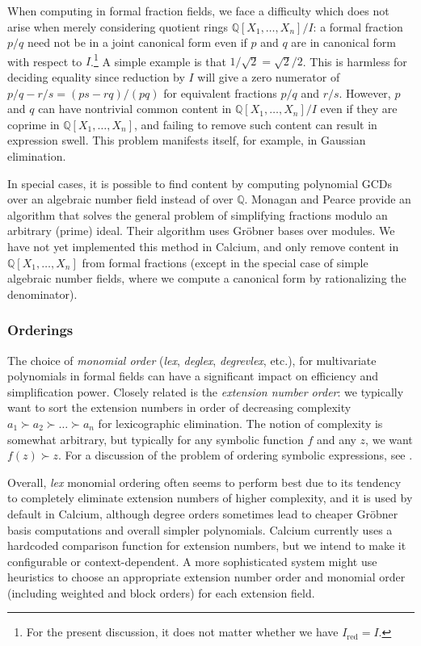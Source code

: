 \documentclass[11pt,a4paper]{article}
\begin{document}
When computing in formal fraction fields,
we face a difficulty
which does not arise when merely considering
quotient rings
$\mathbb{Q}[X_1,\ldots,X_n] / I$:
a formal fraction $p / q$ need not be
in a joint canonical form even if $p$ and $q$ are in canonical
form with respect to $I$.\footnote{For the present discussion, it does
not matter whether we have $I_{\text{red}} = I$.}
A simple example is that $1/\sqrt{2} = \sqrt{2}/2$.
This is harmless for deciding equality since
reduction by $I$ will give a zero numerator of
$p / q - r / s = (ps - rq)/(pq)$ for equivalent fractions $p/q$ and $r/s$.
However, $p$ and $q$ can have nontrivial
common content in $\mathbb{Q}[X_1,\ldots,X_n] / I$
even if they are coprime in $\mathbb{Q}[X_1,\ldots,X_n]$,
and failing to remove such content can result in expression swell.
This problem manifests itself, for example, in Gaussian elimination.

In special cases, it is possible to find
content by computing polynomial GCDs over an algebraic number field
instead of over $\mathbb{Q}$.
Monagan and Pearce \cite{Mon2006} provide
an algorithm that solves the general problem of simplifying
fractions modulo an arbitrary (prime) ideal.
Their algorithm uses Gr\"{o}bner bases over modules.
We have not yet implemented this method in Calcium,
and only remove content in $\mathbb{Q}[X_1,\ldots,X_n]$
from formal fractions
(except in the special case of simple algebraic number fields,
where we compute a canonical form by rationalizing the denominator).

\subsubsection{Orderings}

The choice of \emph{monomial order} (\emph{lex}, \emph{deglex}, \emph{degrevlex}, etc.),
for multivariate polynomials in formal fields
can have a significant impact on efficiency and simplification power.
Closely related is the \emph{extension number order}: we typically
want to sort the extension numbers
in order of decreasing
complexity $a_1 \succ a_2 \succ \ldots \succ a_n$
for lexicographic elimination.
The notion of complexity is somewhat
arbitrary, but typically for any symbolic function $f$ and
any $z$, we want $f(z) \succ z$. For a discussion
of the problem of ordering symbolic expressions, see \cite{Mos1971,Car2004}.

Overall, \emph{lex} monomial ordering often seems to perform best
due to its tendency to completely eliminate extension numbers of higher complexity,
and it is used by default in Calcium,
although degree orders sometimes lead to cheaper
Gr\"{o}bner basis computations and overall simpler polynomials.
Calcium currently uses a hardcoded comparison function for
extension numbers, but we intend
to make it configurable or context-dependent.
A more sophisticated system might use heuristics
to choose an appropriate extension number order and monomial order (including
weighted and block orders) for each extension field.
\end{document}
